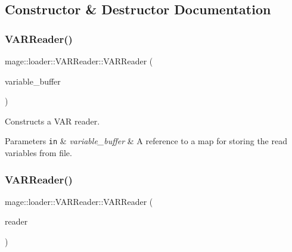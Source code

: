 \subsection{Constructor \& Destructor Documentation}
\hypertarget{classmage_1_1loader_1_1_v_a_r_reader_ae06b2b97d9a0ce16047b0c8cfcd4a73f}{}\label{classmage_1_1loader_1_1_v_a_r_reader_ae06b2b97d9a0ce16047b0c8cfcd4a73f} 
\subsubsection{\texorpdfstring{V\+A\+R\+Reader()}{VARReader()}\hspace{0.1cm}{\footnotesize\ttfamily [1/3]}}
{\footnotesize\ttfamily mage\+::loader\+::\+V\+A\+R\+Reader\+::\+V\+A\+R\+Reader (\begin{DoxyParamCaption}\item[{std\+::map$<$ string, \hyperlink{namespacemage_aa1fe0628487e0706e44efdc62dbdb3a2}{Value} $>$ \&}]{variable\+\_\+buffer }\end{DoxyParamCaption})\hspace{0.3cm}{\ttfamily [explicit]}}

Constructs a V\+AR reader.


\begin{DoxyParams}[1]{Parameters}
\mbox{\tt in}  & {\em variable\+\_\+buffer} & A reference to a map for storing the read variables from file. \\
\hline
\end{DoxyParams}
\hypertarget{classmage_1_1loader_1_1_v_a_r_reader_ab4ab4d94c90a2797ae40e54e0dd7c127}{}\label{classmage_1_1loader_1_1_v_a_r_reader_ab4ab4d94c90a2797ae40e54e0dd7c127} 
\subsubsection{\texorpdfstring{V\+A\+R\+Reader()}{VARReader()}\hspace{0.1cm}{\footnotesize\ttfamily [2/3]}}
{\footnotesize\ttfamily mage\+::loader\+::\+V\+A\+R\+Reader\+::\+V\+A\+R\+Reader (\begin{DoxyParamCaption}\item[{const \hyperlink{classmage_1_1loader_1_1_v_a_r_reader}{V\+A\+R\+Reader} \&}]{reader }\end{DoxyParamCaption})\hspace{0.3cm}{\ttfamily [delete]}}

